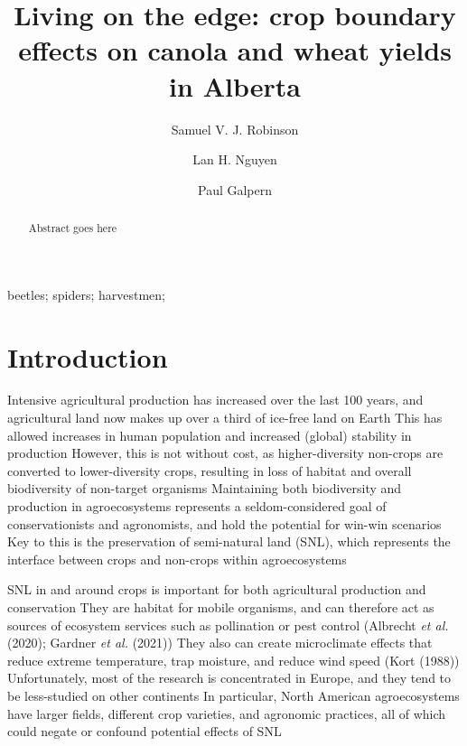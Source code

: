 \documentclass[]{elsarticle} %
\begin{document}
\begin{frontmatter}

  \title{Living on the edge: crop boundary effects on canola and wheat yields in Alberta}
    \author[University of Calgary]{Samuel V. J. Robinson}
    \author[University of Calgary]{Lan H. Nguyen}
    \author[University of Calgary]{Paul Galpern}
      \address[University of Calgary]{2500 University Drive NW, Calgary, AB}
  
  \begin{abstract}
  Abstract goes here
  \end{abstract}
   \begin{keyword} beetles; spiders; harvestmen;\end{keyword}
 \end{frontmatter}

\newpage
\doublespacing

\hypertarget{introduction}{%
\section{Introduction}\label{introduction}}

Intensive agricultural production has increased over the last 100 years, and agricultural land now makes up over a third of ice-free land on Earth
This has allowed increases in human population and increased (global) stability in production
However, this is not without cost, as higher-diversity non-crops are converted to lower-diversity crops, resulting in loss of habitat and overall biodiversity of non-target organisms
Maintaining both biodiversity and production in agroecosystems represents a seldom-considered goal of conservationists and agronomists, and hold the potential for win-win scenarios
Key to this is the preservation of semi-natural land (SNL), which represents the interface between crops and non-crops within agroecosystems

SNL in and around crops is important for both agricultural production and conservation
They are habitat for mobile organisms, and can therefore act as sources of ecosystem services such as pollination or pest control (Albrecht \emph{et al.} (2020); Gardner \emph{et al.} (2021))
They also can create microclimate effects that reduce extreme temperature, trap moisture, and reduce wind speed (Kort (1988))
Unfortunately, most of the research is concentrated in Europe, and they tend to be less-studied on other continents
In particular, North American agroecosystems have larger fields, different crop varieties, and agronomic practices, all of which could negate or confound potential effects of SNL
\end{document}
